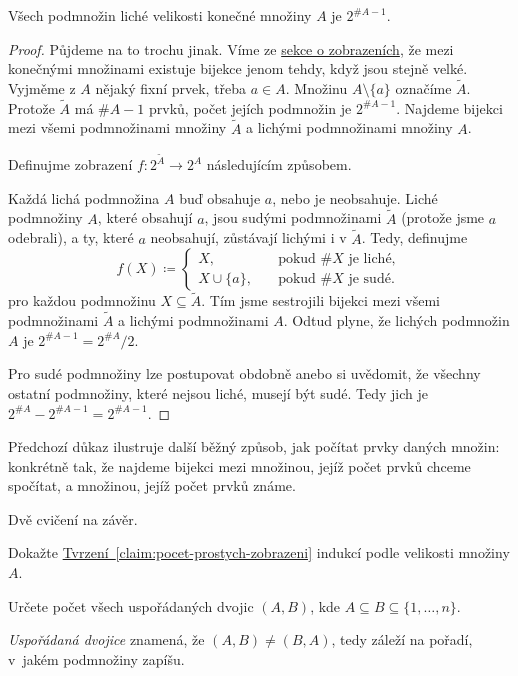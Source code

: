\begin{claim}
\label{claim:pocet-podmnozin-liche-velikosti}
 Všech podmnožin liché velikosti konečné množiny $A$ je $2^{\#A - 1}$.
\end{claim}
\begin{proof}
 Půjdeme na to trochu jinak. Víme ze \hyperref[ssec:zobrazeni]{sekce o
 zobrazeních}, že mezi konečnými množinami existuje bijekce jenom tehdy, když
 jsou stejně velké. Vyjměme z $A$ nějaký fixní prvek, třeba $a \in A$. Množinu
 ${A \setminus \{a\}}$ označíme $\tilde{A}$. Protože $\tilde{A}$ má $\# A - 1$
 prvků, počet jejích podmnožin je $2^{\# A - 1}$. Najdeme bijekci mezi všemi
 podmnožinami množiny $\tilde{A}$ a lichými podmnožinami množiny $A$.

 Definujme zobrazení $f:2^{\tilde{A}} \to 2^{A}$ následujícím způsobem.

 Každá lichá podmnožina $A$ buď obsahuje $a$, nebo je neobsahuje. Liché
 podmnožiny $A$, které obsahují $a$, jsou sudými podmnožinami $\tilde{A}$
 (protože jsme $a$ odebrali), a ty, které $a$ neobsahují, zůstávají lichými i v
 $\tilde{A}$. Tedy, definujme
 \[
  f(X) \coloneqq
  \begin{cases}
   X, &\quad \text{pokud $\# X$ je liché},\\
   X \cup \{a\}, &\quad \text{pokud $\# X$ je sudé}.
  \end{cases}
 \]
 pro každou podmnožinu $X \subseteq \tilde{A}$. Tím jsme sestrojili bijekci mezi
 všemi podmnožinami $\tilde{A}$ a lichými podmnožinami $A$. Odtud plyne, že
 lichých podmnožin $A$ je $2^{\# A - 1} = 2^{\# A} / 2$.

 Pro sudé podmnožiny lze postupovat obdobně anebo si uvědomit, že všechny
 ostatní podmnožiny, které nejsou liché, musejí být sudé. Tedy jich je $2^{\# A}
 - 2^{\# A - 1} = 2^{\# A - 1}$.
\end{proof}

Předchozí důkaz ilustruje další běžný způsob, jak počítat prvky daných množin:
konkrétně tak, že najdeme bijekci mezi množinou, jejíž počet prvků chceme
spočítat, a množinou, jejíž počet prvků známe.

Dvě cvičení na závěr.

\begin{exercise}
 Dokažte
 \hyperref[claim:pocet-prostych-zobrazeni]{Tvrzení~\ref*{claim:pocet-prostych-zobrazeni}}
 indukcí podle velikosti množiny $A$.
\end{exercise}

\begin{exercise}
 Určete počet všech uspořádaných dvojic $(A,B)$, kde $A \subseteq B \subseteq
 \{1,\ldots,n\}$.

 \emph{Uspořádaná dvojice} znamená, že $(A,B) \neq (B,A)$, tedy záleží na
 pořadí, v~jakém podmnožiny zapíšu.
\end{exercise}
